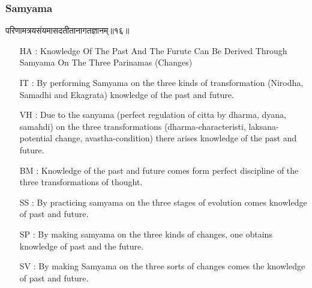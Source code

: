 \begin{frame}[fragile]\frametitle{Samyama}
\begin{sanskrit}
परिणामत्रयसंयमासदतीतानागतज्ञानम्॥१६॥
\end{sanskrit}

	\begin{itemize}
	\item [HA]: Knowledge Of The Past And The Furute Can Be Derived Through Samyama On The Three Parinamas (Changes)
	\item [IT]: By performing Samyama on the three kinds of transformation (Nirodha, Samadhi and Ekagrata) knowledge of the past and future.
	\item [VH]: Due to the sanyama (perfect regulation of citta by dharma, dyana, samahdi) on the three transformations (dharma-characteristi, laksana-potential change, avastha-condition) there arises knowledge of the past and future.
	\item [BM]: Knowledge of the past and future comes form perfect discipline of the three transformations of thought.
	\item [SS]: By practicing samyama on the three stages of evolution comes knowledge of past and future.
	\item [SP]: By making samyama on the three kinds of changes, one obtains knowledge of past and the future.
	\item [SV]: By making Samyama on the three sorts of changes comes the knowledge of past and future. 
	\end{itemize}
\end{frame}

